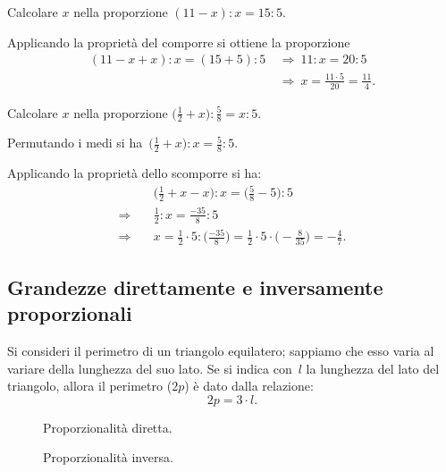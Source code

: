 \begin{exrig}
  \begin{esempio}
    Calcolare $x$ nella proporzione $(11-x):x=15:5$.

  Applicando la proprietà del comporre si ottiene la proporzione
  \begin{align*}
  (11-x+x):x=(15+5):5 &\:\Rightarrow\: 11:x=20:5\\
  &\:\Rightarrow\: x=\frac{11\cdot5}{20}=\frac{11}{4}.
  \end{align*}
  \end{esempio}

\begin{esempio}
 Calcolare $x$ nella proporzione $\displaystyle{\bigg(\frac{1}{2}+x\bigg):\frac{5}{8}=x:5}$.

 Permutando i medi si ha~$\displaystyle{\bigg(\frac{1}{2}+x\bigg):x=\frac{5}{8}:5}$.

 Applicando la proprietà dello scomporre si ha:
\begin{align*}
  &\bigg(\frac{1}{2}+x-x\bigg):x=\bigg(\frac{5}{8}-5\bigg):5\\
\Rightarrow\quad &\frac{1}{2}:x=\frac{-35}{8}:5\\
\Rightarrow\quad &x=\frac{1}{2}\cdot5:\bigg(\frac{-35}{8}\bigg)=\frac{1}{2}\cdot5%
\cdot\bigg(-\frac{8}{35}\bigg)=-\frac{4}{7}.
\end{align*}
\end{esempio}
\end{exrig}

\vspazio\ovalbox{\risolvii \ref{ese:3.117}, \ref{ese:3.118}, \ref{ese:3.119}, \ref{ese:3.120}, \ref{ese:3.121}, \ref{ese:3.122}, \ref{ese:3.123}, \ref{ese:3.124}, \ref{ese:3.125}}

\subsection{Grandezze direttamente e inversamente proporzionali}

Si consideri il perimetro di un triangolo equilatero;
sappiamo che esso varia al variare della lunghezza del suo lato.
Se si indica con~$l$ la lunghezza del lato del triangolo, allora il perimetro ($2p$) è dato dalla relazione:
\[2p=3\cdot l.\]

\begin{figure}[tbh]
\begin{minipage}[t]{.48\textwidth}
  \centering
  \caption{Proporzionalità diretta.}\label{fig:3.2}  
\end{minipage}\hfil
 \begin{minipage}[t]{.48\textwidth}  
 \centering
 \caption{Proporzionalità inversa.}\label{fig:3.3}
 \end{minipage}
\end{figure}

